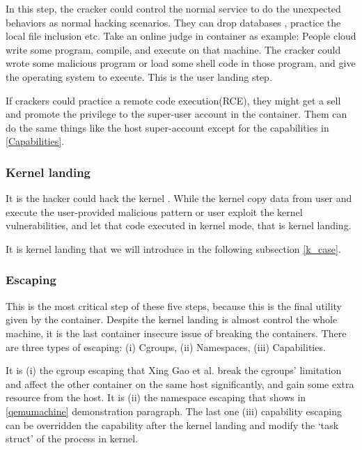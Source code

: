 In this step, the cracker could control the normal service to do the unexpected behaviors as
normal hacking scenarios. They can drop databases \cite{halfond2006classification} , practice
the local file inclusion \cite{hassan2018saisan, whitman2011principles} etc.
Take an online judge in container as example: People cloud write some program, compile, and execute on that
machine. The cracker could wrote some malicious program or load some shell code in those program,
and give the operating system to execute. This is the user landing step.

If crackers could practice a remote code execution(RCE), they might get a sell and promote the privilege to
the super-user account in the container. Them can do the same things like the host super-account except for
the capabilities in \ref{Capabilities}.

\subsubsection{Kernel landing}

It is the hacker could hack the kernel
\cite{gaspar2006root, dam2018automatic, jimenez2016vulnerability, 10.1007/978-1-4020-8739-4_86}.
While the kernel copy data from user and execute the user-provided malicious pattern
or user exploit the kernel vulnerabilities, and let that code executed in kernel mode, that is kernel landing.

It is kernel landing that we will introduce in the following subsection \ref{k_case}.

\subsubsection{Escaping}

This is the most critical step of these five steps, because this is the final utility given by the
container. Despite the kernel landing is almost control the whole machine, it is the last container
insecure issue of breaking the containers. There are three types of escaping: (\Rn{1}) Cgroups,
(\Rn{2}) Namespaces, (\Rn{3}) Capabilities.

It is (\Rn{1}) the cgroup escaping that Xing Gao et al. \cite{10.1145/3319535.3354227} break the
cgroups' limitation and affect the other container on the same host significantly, and gain
some extra resource from the host. It is (\Rn{2}) the namespace escaping that shows in \ref{qemumachine}
demonstration paragraph.
The last one (\Rn{3}) capability escaping can be overridden the capability after the kernel landing
and modify the `task struct' of the process in kernel.

